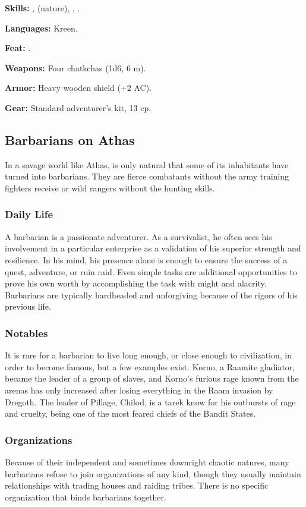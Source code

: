 \textbf{Skills:} ,  (nature), , .

\textbf{Languages:} Kreen.

\textbf{Feat:} .

\textbf{Weapons:} Four chatkchas (1d6, 6 m).

\textbf{Armor:} Heavy wooden shield (+2 AC).

\textbf{Gear:} Standard adventurer's kit, 13 cp.


\subsection{Barbarians on Athas}

In a savage world like Athas, is only natural that some of its inhabitants have turned into barbarians. They are fierce combatants without the army training fighters receive or wild rangers without the hunting skills.

\subsubsection{Daily Life}
A barbarian is a passionate adventurer. As a survivalist, he often sees his involvement in a particular enterprise as a validation of his superior strength and resilience. In his mind, his presence alone is enough to ensure the success of a quest, adventure, or ruin raid. Even simple tasks are additional opportunities to prove his own worth by accomplishing the task with might and alacrity. Barbarians are typically hardheaded and unforgiving because of the rigors of his previous life.

\subsubsection{Notables}
It is rare for a barbarian to live long enough, or close enough to civilization, in order to become famous, but a few examples exist. Korno, a Raamite gladiator, became the leader of a group of slaves, and Korno's furious rage known from the arenas has only increased after losing everything in the Raam invasion by Dregoth. The leader of Pillage, Chilod, is a tarek know for his outbursts of rage and cruelty, being one of the most feared chiefs of the Bandit States.

\subsubsection{Organizations}
Because of their independent and sometimes downright chaotic natures, many barbarians refuse to join organizations of any kind, though they usually maintain relationships with trading houses and raiding tribes. There is no specific organization that binds barbarians together.

